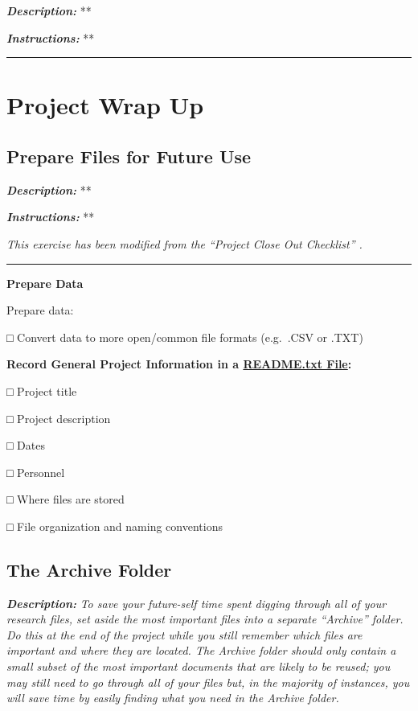 \documentclass[
]{book}
\begin{document}
\textbf{\emph{Description:}} **

\textbf{\emph{Instructions:}} **

\begin{center}\rule{0.5\linewidth}{0.5pt}\end{center}

\hypertarget{project-wrap-up}{%
\chapter{Project Wrap Up}\label{project-wrap-up}}

\hypertarget{future-use}{%
\section{Prepare Files for Future Use}\label{future-use}}

\textbf{\emph{Description:}} **

\textbf{\emph{Instructions:}} **

\emph{This exercise has been modified from the ``Project Close Out Checklist'' \citet{briney_project_2020}.}

\begin{center}\rule{0.5\linewidth}{0.5pt}\end{center}

\textbf{Prepare Data}

Prepare data:

□ Convert data to more open/common file formats (e.g.~.CSV or .TXT)

\textbf{Record General Project Information in a \protect\hyperlink{readme-txt}{README.txt File}:}

□ Project title

□ Project description

□ Dates

□ Personnel

□ Where files are stored

□ File organization and naming conventions

\hypertarget{archive-folder}{%
\section{The Archive Folder}\label{archive-folder}}

\textbf{\emph{Description:}} \emph{To save your future-self time spent digging through all of your research files, set aside the most important files into a separate ``Archive'' folder. Do this at the end of the project while you still remember which files are important and where they are located. The Archive folder should only contain a small subset of the most important documents that are likely to be reused; you may still need to go through all of your files but, in the majority of instances, you will save time by easily finding what you need in the Archive folder.}
\end{document}
